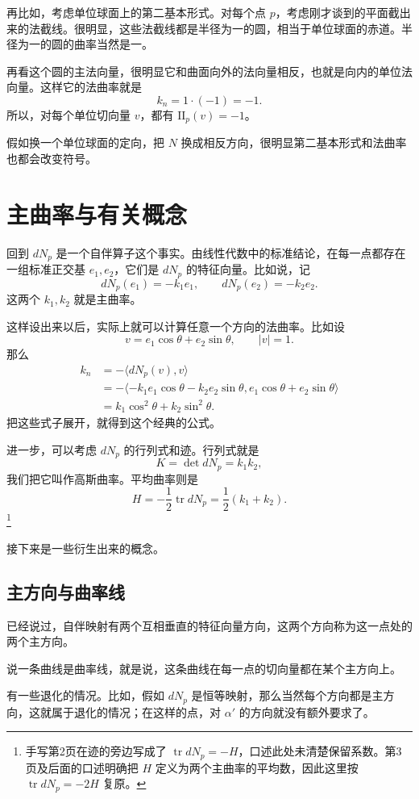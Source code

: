 \documentclass[UTF8,11pt,a4paper]{ctexart}
\newcommand{\ip}[2]{\langle #1,#2\rangle}
\newcommand{\II}{\mathrm{II}}
\begin{document}
再比如，考虑单位球面上的第二基本形式。对每个点 $p$，考虑刚才谈到的平面截出来的法截线。很明显，这些法截线都是半径为一的圆，相当于单位球面的赤道。半径为一的圆的曲率当然是一。

再看这个圆的主法向量，很明显它和曲面向外的法向量相反，也就是向内的单位法向量。这样它的法曲率就是
\[
k_n=1\cdot(-1)=-1.
\]
所以，对每个单位切向量 $v$，都有 $\II_p(v)=-1$。

假如换一个单位球面的定向，把 $N$ 换成相反方向，很明显第二基本形式和法曲率也都会改变符号。

\section{主曲率与有关概念}

回到 $dN_p$ 是一个自伴算子这个事实。由线性代数中的标准结论，在每一点都存在一组标准正交基 $e_1,e_2$，它们是 $dN_p$ 的特征向量。比如说，记
\[
dN_p(e_1)=-k_1e_1,\qquad dN_p(e_2)=-k_2e_2.
\]
这两个 $k_1,k_2$ 就是主曲率。

这样设出来以后，实际上就可以计算任意一个方向的法曲率。比如设
\[
v=e_1\cos\theta+e_2\sin\theta,\qquad |v|=1.
\]
那么
\[
\begin{aligned}
k_n&=-\ip{dN_p(v)}{v}\\
&=-\ip{-k_1e_1\cos\theta-k_2e_2\sin\theta}
{e_1\cos\theta+e_2\sin\theta}\\
&=k_1\cos^2\theta+k_2\sin^2\theta.
\end{aligned}
\]
把这些式子展开，就得到这个经典的公式。

进一步，可以考虑 $dN_p$ 的行列式和迹。行列式就是
\[
K=\det dN_p=k_1k_2,
\]
我们把它叫作高斯曲率。平均曲率则是
\[
H=-\frac12\operatorname{tr}dN_p=\frac12(k_1+k_2).
\]\footnote{手写第2页在迹的旁边写成了 $\operatorname{tr}dN_p=-H$，口述此处未清楚保留系数。第3页及后面的口述明确把 $H$ 定义为两个主曲率的平均数，因此这里按 $\operatorname{tr}dN_p=-2H$ 复原。}

接下来是一些衍生出来的概念。

\subsection{主方向与曲率线}

已经说过，自伴映射有两个互相垂直的特征向量方向，这两个方向称为这一点处的两个主方向。

说一条曲线是曲率线，就是说，这条曲线在每一点的切向量都在某个主方向上。

有一些退化的情况。比如，假如 $dN_p$ 是恒等映射，那么当然每个方向都是主方向，这就属于退化的情况；在这样的点，对 $\alpha'$ 的方向就没有额外要求了。
\end{document}
